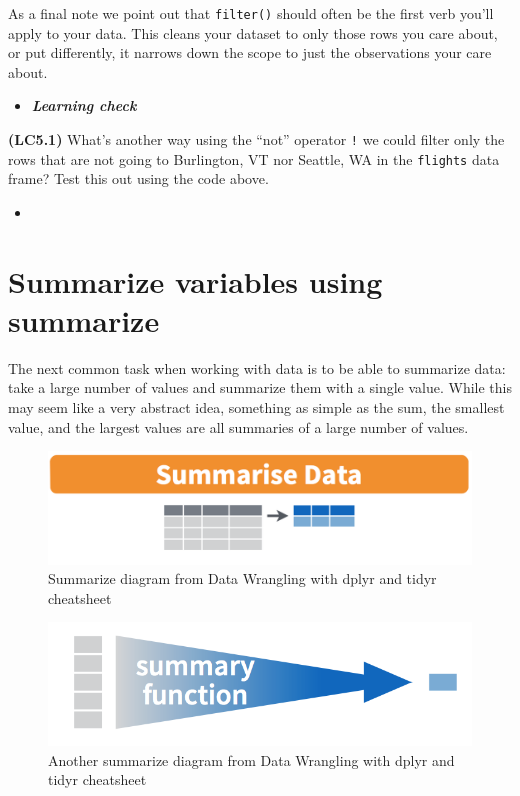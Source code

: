 \documentclass[12pt,]{krantz}
\newenvironment{rmdblock}[1]
  {\begin{shaded*}
  \begin{itemize}
  \renewcommand{\labelitemi}{
    \raisebox{-.7\height}[0pt][0pt]{
    }
  }
  \item
  }
  {
  \end{itemize}
  \end{shaded*}
  }
\newenvironment{learncheck}
  {\begin{rmdblock}{warning}}
  {\end{rmdblock}}
\begin{document}
As a final note we point out that \texttt{filter()} should often be the
first verb you'll apply to your data. This cleans your dataset to only
those rows you care about, or put differently, it narrows down the scope
to just the observations your care about.

\begin{learncheck}
\textbf{\emph{Learning check}}
\end{learncheck}

\textbf{(LC5.1)} What's another way using the ``not'' operator
\texttt{!} we could filter only the rows that are not going to
Burlington, VT nor Seattle, WA in the \texttt{flights} data frame? Test
this out using the code above.

\begin{learncheck}

\end{learncheck}

\section{Summarize variables using summarize}\label{summarize}

The next common task when working with data is to be able to summarize
data: take a large number of values and summarize them with a single
value. While this may seem like a very abstract idea, something as
simple as the sum, the smallest value, and the largest values are all
summaries of a large number of values.

\begin{figure}

{\centering \includegraphics[width=\textwidth]{images/summarize1} 

}

\caption{Summarize diagram from Data Wrangling with dplyr and tidyr cheatsheet}\label{fig:sum1}
\end{figure}

\begin{figure}

{\centering \includegraphics[width=\textwidth]{images/summary} 

}

\caption{Another summarize diagram from Data Wrangling with dplyr and tidyr cheatsheet}\label{fig:sum2}
\end{figure}
\end{document}
